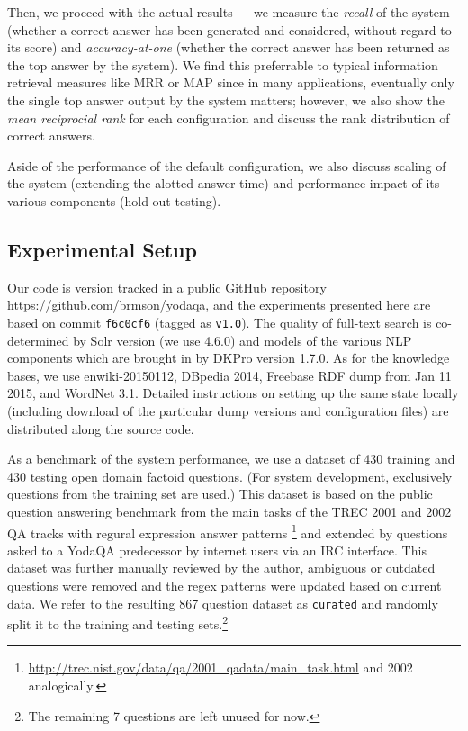 \documentclass{poster15}
\begin{document}
Then, we proceed with the actual results --- we measure the \textit{recall}
of the system (whether a correct answer has been generated and considered,
without regard to its score) and \textit{accuracy-at-one} (whether the
correct answer has been returned as the top answer by the system).
We find this preferrable to typical information retrieval measures like MRR or MAP
since in many applications, eventually only the single top answer output by the system
matters; however, we also show the \textit{mean reciprocial rank}
for each configuration and discuss the rank distribution of correct answers.

Aside of the performance of the default configuration, we also discuss
scaling of the system (extending the alotted answer time) and performance
impact of its various components (hold-out testing).

\subsection{Experimental Setup}

Our code is version tracked in a public GitHub repository
\url{https://github.com/brmson/yodaqa}, and the experiments presented
here are based on commit \texttt{f6c0cf6} (tagged as \texttt{v1.0}).
The quality of full-text search is co-determined by Solr version
(we use 4.6.0) and models of the various NLP components which are brought
in by DKPro version 1.7.0.
As for the knowledge bases, we use enwiki-20150112, DBpedia 2014,
Freebase RDF dump from Jan 11 2015, and WordNet 3.1.
Detailed instructions on setting up the same state locally (including
download of the particular dump versions and configuration files) are
distributed along the source code.

As a benchmark of the system performance, we use a dataset of 430 training
and 430 testing open domain factoid questions.
(For system development, exclusively questions from the training set are used.)
This dataset is based on the public question answering benchmark from
the main tasks of the TREC 2001 and 2002 QA tracks
with regural expression answer patterns%
\footnote{\url{http://trec.nist.gov/data/qa/2001_qadata/main_task.html} and 2002 analogically.}
and extended by questions asked
to a YodaQA predecessor by internet users via an IRC interface.
This dataset was further manually reviewed by the author,
ambiguous or outdated questions were removed
and the regex patterns were updated based on current data.
We refer to the resulting 867 question dataset as \texttt{curated} and
randomly split it to the training and testing sets.\footnote{The remaining
7 questions are left unused for now.}
\end{document}
